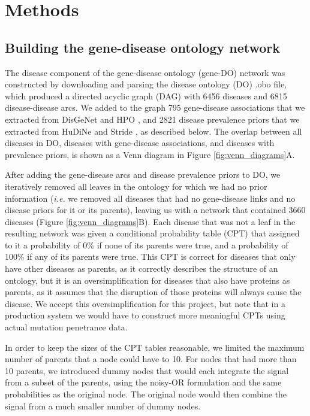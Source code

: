 \documentclass[11pt]{article}
\begin{document}
\section{Methods}


\subsection{Building the gene-disease ontology network}

The disease component of the gene-disease ontology (gene-DO) network was constructed by downloading and parsing the disease ontology (DO) .obo file, which produced a directed acyclic graph (DAG) with 6456 diseases and 6815 disease-disease arcs. We added to the graph 795 gene-disease associations that we extracted from DisGeNet \cite{Bauer-Mehren2010} and HPO \cite{Kohler2013}, and 2821 disease prevalence priors that we extracted from HuDiNe \cite{Hidalgo2009} and Stride \cite{Finlayson2014}, as described below. The overlap between all diseases in DO, diseases with gene-disease associations, and diseases with prevalence priors, is shown as a Venn diagram in Figure \ref{fig:venn_diagrams}A.

After adding the gene-disease arcs and disease prevalence priors to DO, we iteratively removed all leaves in the ontology for which we had no prior information (\textit{i.e.} we removed all diseases that had no gene-disease links and no disease priors for it or its parents), leaving us with a network that contained 3660 diseases (Figure \ref{fig:venn_diagrams}B). Each disease that was not a leaf in the resulting network was given a conditional probability table (CPT) that assigned to it a probability of 0\% if none of its parents were true, and a probability of 100\% if any of its parents were true. This CPT is correct for diseases that only have other diseases as parents, as it correctly describes the structure of an ontology, but it is an oversimplification for diseases that also have proteins as parents, as it assumes that the disruption of those proteins will always cause the disease. We accept this oversimplification for this project, but note that in a production system we would have to construct more meaningful CPTs using actual mutation penetrance data.

In order to keep the sizes of the CPT tables reasonable, we limited the maximum number of parents that a node could have to 10. For nodes that had more than 10 parents, we introduced dummy nodes that would each integrate the signal from a subset of the parents, using the noisy-OR formulation and the same probabilities as the original node. The original node would then combine the signal from a much smaller number of dummy nodes.
\end{document}
